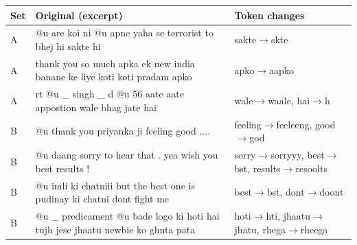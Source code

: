 \begin{tabular}{@{}l p{3.5cm} p{3.2cm}@{}}
\toprule
Set & Original (excerpt) & Token changes\\
\midrule
A & \scriptsize @u are koi ni @u apne yaha se terrorist to bhej hi sakte hi & \scriptsize sakte$\to$skte\\
A & \scriptsize thank you so much apka ek new india banane ke liye koti koti pradam apko & \scriptsize apko$\to$aapko\\
A & \scriptsize rt @u \_ singh \_ d @u 56 aate aate appostion wale bhag jate hai & \scriptsize wale$\to$waale, hai$\to$h\\
B & \scriptsize @u thank you priyanka ji feeling good .... & \scriptsize feeling$\to$feeleeng, good$\to$god\\
B & \scriptsize @u daang sorry to hear that . yea wish you best results ! & \scriptsize sorry$\to$sorryyy, best$\to$bst, results$\to$resoolts\\
B & \scriptsize @u imli ki chatniii but the best one is pudinay ki chatni dont fight me & \scriptsize best$\to$bst, dont$\to$doont\\
B & \scriptsize @u \_ predicament @u bade logo ki hoti hai tujh jese jhaatu newbie ko ghnta pata & \scriptsize hoti$\to$hti, jhaatu$\to$jhatu, rhega$\to$rheega\\
\bottomrule
\end{tabular}
